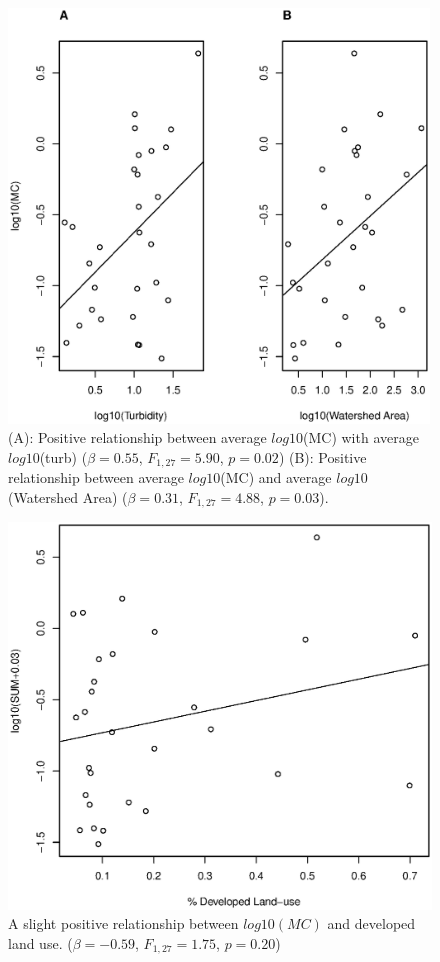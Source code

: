 \begin{figure}
\includegraphics[width=\textwidth, height=11cm]{figures/plot2}
\caption{
(A): Positive relationship between average $log10$(MC) with average $log10$(turb) ($\beta=0.55$, $F_{{1,27}}=5.90$, $p=0.02$)
(B): Positive relationship between average $log10$(MC) and average  $log10$(Watershed Area) ($\beta=0.31$, $F_{{1,27}}=4.88$, $p=0.03$). 
}
\label{fig:plot2}
\end{figure}




\begin{figure}
	\includegraphics[width=\textwidth]{figures/developed}
	\caption{
A slight positive relationship between $log10(MC)$ and developed land use. ($\beta=-0.59$, $F_{{1,27}}=1.75$, $p=0.20$)
}
	\label{fig:developed}
\end{figure}

